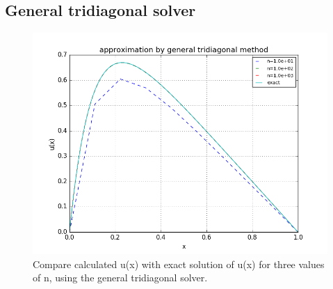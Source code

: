 \documentclass[11pt,a4paper,notitlepage]{article}
\begin{document}
\subsection{General tridiagonal solver}
	\begin{figure}[h!]
		\includegraphics[scale=0.7]{../img/compare_general_exact.png}
		\caption{Compare calculated u(x) with exact solution of u(x) for three values of n, using the general tridiagonal solver.}
		\label{fig:compare_gen_exact}
	\end{figure}
\end{document}
